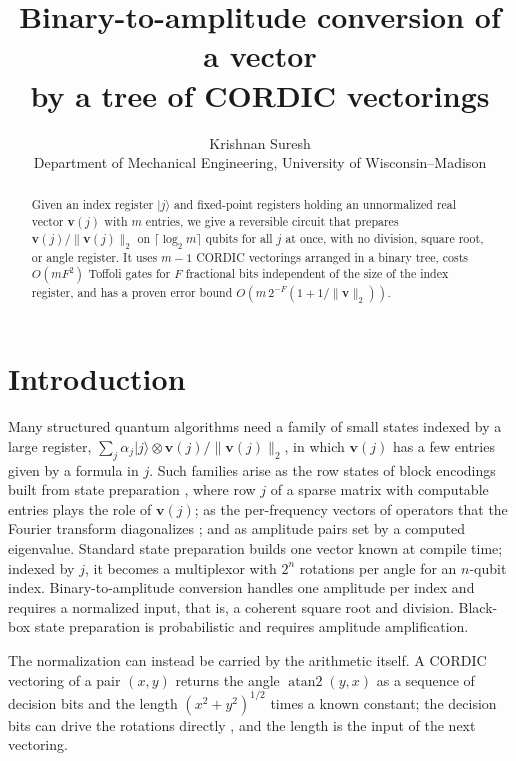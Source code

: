 \documentclass[9pt,twocolumn]{extarticle}
\title{\vspace{-1.6em}Binary-to-amplitude conversion of a vector\\ by a tree of CORDIC vectorings\vspace{-0.6em}}
\author{Krishnan Suresh\\ \small Department of Mechanical Engineering, University of Wisconsin--Madison}
\date{\vspace{-1.2em}}
\newcommand{\norm}[1]{\lVert #1\rVert}
\begin{document}
\maketitle

\begin{abstract}
Given an index register $|j\rangle$ and fixed-point registers holding an
unnormalized real vector $\bm v(j)$ with $m$ entries, we give a reversible
circuit that prepares $\bm v(j)/\norm{\bm v(j)}_2$ on $\lceil\log_2 m\rceil$
qubits for all $j$ at once, with no division, square root, or angle register.
It uses $m - 1$ CORDIC vectorings arranged in a binary tree, costs $O(mF^2)$
Toffoli gates for $F$ fractional bits independent of the size of the index
register, and has a proven error bound $O(m\,2^{-F}(1 + 1/\norm{\bm v}_2))$.
\end{abstract}

\section{Introduction}\label{sec:intro}

Many structured quantum algorithms need a family of small states indexed by a
large register, $\sum_j \alpha_j |j\rangle \otimes \bm v(j)/\norm{\bm v(j)}_2$,
in which $\bm v(j)$ has a few entries given by a formula in $j$. Such families
arise as the row states of block encodings built from state preparation
\cite{gilyen2019quantum,kerenidis2017recommendation}, where row $j$ of a sparse
matrix with computable entries plays the role of $\bm v(j)$; as the
per-frequency vectors of operators that the Fourier transform diagonalizes
\cite{tong2021fast}; and as amplitude pairs set by a computed eigenvalue.
Standard state preparation \cite{mottonen2005transformation,shende2006synthesis}
builds one vector known at compile time; indexed by $j$, it becomes a
multiplexor with $2^n$ rotations per angle for an $n$-qubit index.
Binary-to-amplitude conversion \cite{burge2024quantum} handles one amplitude per
index and requires a normalized input, that is, a coherent square root and
division. Black-box state preparation \cite{grover2000synthesis,sanders2019black}
is probabilistic and requires amplitude amplification.

The normalization can instead be carried by the arithmetic itself. A CORDIC
vectoring \cite{volder1959cordic} of a pair $(x, y)$ returns the angle
$\operatorname{atan2}(y, x)$ as a sequence of decision bits and the length
$(x^2 + y^2)^{1/2}$ times a known constant; the decision bits can drive the
rotations directly \cite{burge2024quantum}, and the length is the input of the
next vectoring.
\end{document}
